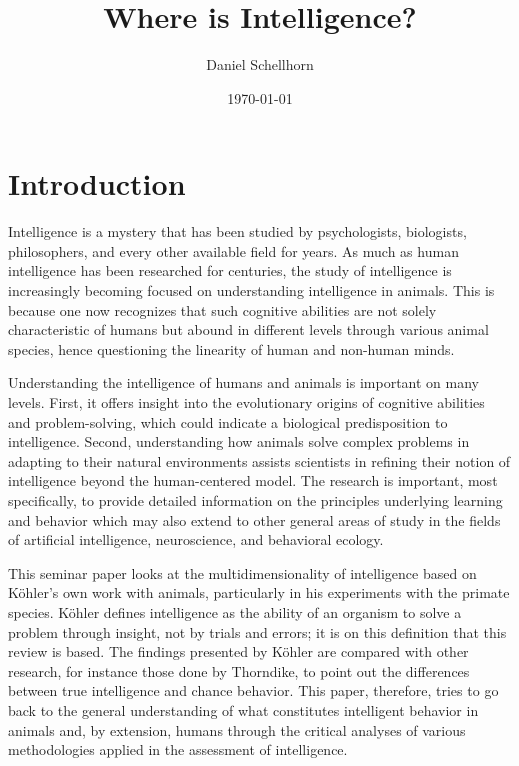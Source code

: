 \documentclass[12pt]{article}
\title{Where is Intelligence?}
\author{Daniel Schellhorn}
\date{\today}
\begin{document}
\maketitle

\section{Introduction}

Intelligence is a mystery that has been studied by psychologists, biologists, philosophers, and every other available field for years. As much as human intelligence has been researched for centuries, the study of intelligence is increasingly becoming focused on understanding intelligence in animals. This is because one now recognizes that such cognitive abilities are not solely characteristic of humans but abound in different levels through various animal species, hence questioning the linearity of human and non-human minds.

Understanding the intelligence of humans and animals is important on many levels. First, it offers insight into the evolutionary origins of cognitive abilities and problem-solving, which could indicate a biological predisposition to intelligence. Second, understanding how animals solve complex problems in adapting to their natural environments assists scientists in refining their notion of intelligence beyond the human-centered model. The research is important, most specifically, to provide detailed information on the principles underlying learning and behavior which may also extend to other general areas of study in the fields of artificial intelligence, neuroscience, and behavioral ecology.

This seminar paper looks at the multidimensionality of intelligence based on Köhler's own work with animals, particularly in his experiments with the primate species. Köhler defines intelligence as the ability of an organism to solve a problem through insight, not by trials and errors; it is on this definition that this review is based. The findings presented by Köhler are compared with other research, for instance those done by Thorndike, to point out the differences between true intelligence and chance behavior. This paper, therefore, tries to go back to the general understanding of what constitutes intelligent behavior in animals and, by extension, humans through the critical analyses of various methodologies applied in the assessment of intelligence.

\newpage
\end{document}
